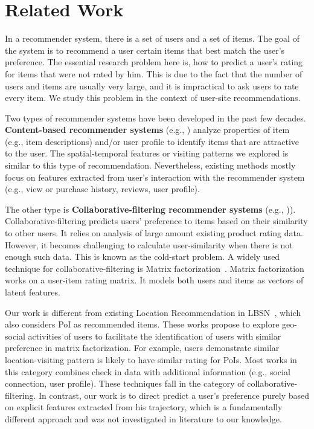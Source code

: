 
\section{Related Work}\label{sec:rw}

In a recommender system, there is a set of users and a set of items. The goal of the system is to recommend a user certain items that best match the user's preference. The essential research problem here is, how to predict a user's rating for items that were not rated by him. This is due to the fact that the number of users and items are usually very large, and it is impractical to ask users to rate every item. We study this problem in the context of user-site recommendations.

Two types of recommender systems have been developed in the past few decades. \textbf{Content-based recommender systems} (e.g., \cite{contentbasedLang95,contentbasedPazzani97}) analyze properties of item (e.g., item descriptions) and/or user profile to identify items that are attractive to the user. The spatial-temporal features or visiting patterns we explored is similar to this type of recommendation. Nevertheless, existing methods mostly focus on features extracted from user's interaction with the recommender system (e.g., view or purchase history, reviews, user profile).

The other type is \textbf{Collaborative-filtering recommender systems} (e.g., \cite{userUserRec94,amazonRecommendation,MFRec09})). Collaborative-filtering predicts users' preference to items based on their similarity to other users. It relies on analysis of large amount existing product rating data. However, it becomes challenging to calculate user-similarity when there is not enough such data. This is known as the cold-start problem. A widely used technique for collaborative-filtering is Matrix factorization~\cite{koren2009matrix}. Matrix factorization works on a user-item rating matrix. It models both users and items as vectors of latent features.

Our work is different from existing Location Recommendation in LBSN~\cite{yu2015survey, ye2010location,wang2013location, cheng2012fused}, which also considers PoI as recommended items. These works propose to explore geo-social activities of users to facilitate the identification of users with similar preference in matrix factorization. For example, users demonstrate similar location-visiting pattern is likely to have similar rating for PoIs. Most works in this category combines check in data with additional information (e.g., social connection, user profile). These techniques fall in the category of collaborative-filtering. In contrast, our work is to direct predict a user's preference purely based on explicit features extracted from his trajectory, which is a fundamentally different approach and was not investigated in literature to our knowledge.